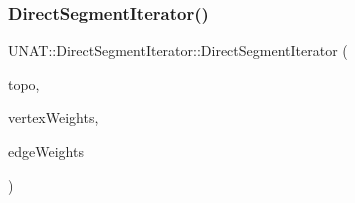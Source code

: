\subsubsection{\texorpdfstring{DirectSegmentIterator()}{DirectSegmentIterator()}\hspace{0.1cm}{\footnotesize\ttfamily [1/4]}}
{\footnotesize\ttfamily U\+N\+A\+T\+::\+Direct\+Segment\+Iterator\+::\+Direct\+Segment\+Iterator (\begin{DoxyParamCaption}\item[{\mbox{\hyperlink{classUNAT_1_1Topology}{Topology}} \&}]{topo,  }\item[{\mbox{\hyperlink{include_2swMacro_8h_a113cf5f6b5377cdf3fac6aa4e443e9aa}{sw\+Int}} $\ast$}]{vertex\+Weights,  }\item[{\mbox{\hyperlink{include_2swMacro_8h_a113cf5f6b5377cdf3fac6aa4e443e9aa}{sw\+Int}} $\ast$}]{edge\+Weights }\end{DoxyParamCaption})}

